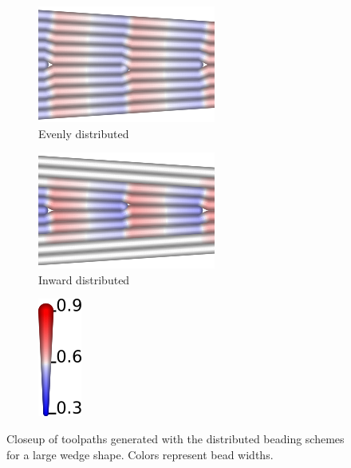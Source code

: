 \begin{figure}
\centering
\setlength{\figwidth}{.4\columnwidth}
\setlength{\figheight}{.25\columnwidth}
\begin{subfigure}{\figwidth}\centering
\includegraphics[height=\figheight]{sources/validation/wedge_Distributed_pretty_evenly.png}
\caption{Evenly distributed}
\end{subfigure}
\begin{subfigure}{\figwidth}\centering
\includegraphics[height=\figheight]{sources/validation/wedge_Distributed_pretty_inward.png}
\caption{Inward distributed}
\end{subfigure}
\begin{subfigure}{.1\columnwidth}\centering
\includegraphics[height=\figheight]{sources/validation/wedge_Distributed_pretty_legend.png}
\end{subfigure}
\caption{
Closeup of toolpaths generated with the distributed beading schemes for a large wedge shape.
Colors represent bead widths.
}
\label{distributed_comparison}
\end{figure}






